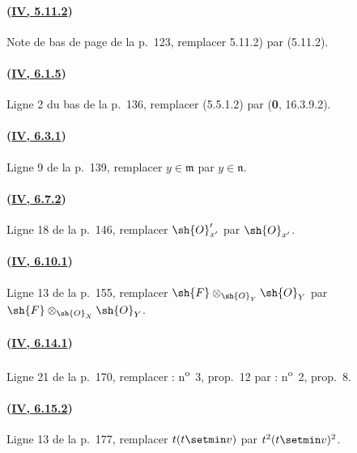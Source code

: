\paragraph{({\texorpdfstring{\protect\hyperref[canon-index.ega4.c04.cor.5-11-2]{IV, 5.11.2}}{IV, 5.11.2}})}
Note de bas de page de la p.~123, remplacer 5.11.2) par (5.11.2).

\paragraph{({\texorpdfstring{\protect\hyperref[canon-index.ega4.c04.prop.6-1-5]{IV, 6.1.5}}{IV, 6.1.5}})}
Ligne 2 du bas de la p.~136, remplacer (5.5.1.2) par
(\textbf{0}, 16.3.9.2).

\paragraph{({\texorpdfstring{\protect\hyperref[canon-index.ega4.c04.prop.6-3-1]{IV, 6.3.1}}{IV, 6.3.1}})}
Ligne 9 de la p.~139, remplacer $y\in\mathfrak m$ par
$y\in\mathfrak n$.

\paragraph{({\texorpdfstring{\protect\hyperref[canon-index.ega4.c04.cor.6-7-2]{IV, 6.7.2}}{IV, 6.7.2}})}
Ligne 18 de la p.~146, remplacer $\sh{O}'_{x'}$ par $\sh{O}_{x'}$.

\paragraph{({\texorpdfstring{\protect\hyperref[canon-index.ega4.c04.statement.6-10-1]{IV, 6.10.1}}{IV, 6.10.1}})}
Ligne 13 de la p.~155, remplacer
$\sh{F}\otimes_{\sh{O}_Y}\sh{O}_Y$ par
$\sh{F}\otimes_{\sh{O}_X}\sh{O}_Y$.

\paragraph{({\texorpdfstring{\protect\hyperref[canon-index.ega4.c04.prop.6-14-1]{IV, 6.14.1}}{IV, 6.14.1}})}
Ligne 21 de la p.~170, remplacer : n\textsuperscript{o}~3, prop.~12
par : n\textsuperscript{o}~2, prop.~8.

\paragraph{({\texorpdfstring{\protect\hyperref[canon-index.ega4.c04.statement.6-15-2]{IV, 6.15.2}}{IV, 6.15.2}})}
Ligne 13 de la p.~177, remplacer $t(t\setmin v)$ par $t^2(t\setmin v)^2$.

